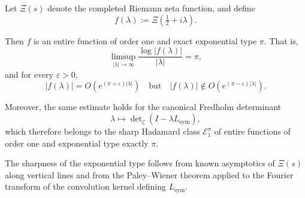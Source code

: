 \begin{lemma}
\label{lem:exact-type-pi}
Let \( \Xi(s) \) denote the completed Riemann zeta function, and define
\[
f(\lambda) := \Xi\left( \tfrac{1}{2} + i\lambda \right).
\]

Then \( f \) is an entire function of order one and exact exponential type \( \pi \). That is,
\[
\limsup_{|\lambda| \to \infty} \frac{\log |f(\lambda)|}{|\lambda|} = \pi,
\]
and for every \( \varepsilon > 0 \),
\[
|f(\lambda)| = O\left( e^{(\pi + \varepsilon)|\lambda|} \right)
\quad \text{but} \quad
|f(\lambda)| \notin O\left( e^{(\pi - \varepsilon)|\lambda|} \right).
\]

\medskip
\noindent
Moreover, the same estimate holds for the canonical Fredholm determinant
\[
\lambda \mapsto \det\nolimits_\zeta(I - \lambda L_{\mathrm{sym}}),
\]
which therefore belongs to the sharp Hadamard class \( \mathcal{E}_1^\pi \) of entire functions of order one and exponential type exactly \( \pi \).

\medskip
\noindent
The sharpness of the exponential type follows from known asymptotics of \( \Xi(s) \) along vertical lines and from the Paley–Wiener theorem applied to the Fourier transform of the convolution kernel defining \( L_{\mathrm{sym}} \).
\end{lemma}
% 